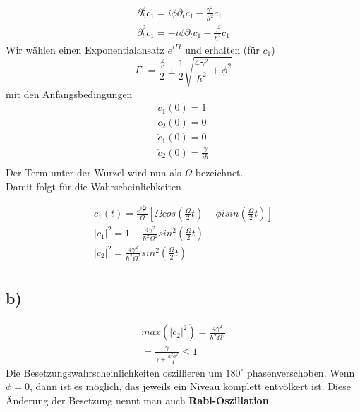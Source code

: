\begin{align}
\partial_t^2 c_1 = i \phi \partial_t c_1 - \frac{\gamma^2}{\hbar^2} c_1 \\
\partial_t^2 c_1 = -i \phi \partial_t c_1 - \frac{\gamma^2}{\hbar^2} c_1
\end{align}
Wir w\"ahlen einen Exponentialansatz $e^{i \Gamma t}$ und erhalten (f\"ur $c_1$)
\begin{equation}
\Gamma_1 = \frac{\phi}{2} \pm \frac{1}{2} \sqrt{\frac{4 \gamma^2}{\hbar^2} + \phi^2}
\end{equation}
mit den Anfangsbedingungen
\begin{align}
c_1 \left( 0 \right) = 1 \\
c_2 \left( 0 \right) = 0 \\
\dot{c}_1 \left( 0 \right) = 0 \\
\dot{c}_2 \left( 0 \right) = \frac{\gamma}{i \hbar} \\
\end{align}
Der Term unter der Wurzel wird nun als $\Omega$ bezeichnet.\\
Damit folgt f\"ur die Wahrscheinlichkeiten

\begin{align}
c_1 \left( t \right) = \frac{e^{i \frac{\theta}{2}t}}{\Omega} \left[ \Omega cos \left( \frac{\Omega}{2} t \right) - \phi i sin \left( \frac{\Omega}{2}t \right) \right] \\
|c_1|^2 = 1 - \frac{4 \gamma^2}{\hbar^2 \Omega^2} sin^2 \left( \frac{\Omega}{2} t \right) \\
|c_2|^2 = \frac{4 \gamma^2}{\hbar^2 \Omega^2} sin^2 \left( \frac{\Omega}{2} t \right) \\
\end{align}

\subsection{b)}

\begin{align}
max \left( |c_2|^2 \right) = \frac{4 \gamma^2}{\hbar^2 \Omega^2} \\
= \frac{\gamma}{\gamma + \frac{\hbar^2 \phi^2}{4}} \leq 1
\end{align}
Die Besetzungswahrscheinlichkeiten oszillieren um $180^{\circ}$ phasenverschoben. Wenn $\phi = 0$, dann ist es m\"oglich, das jeweils ein Niveau komplett entv\"olkert ist. Diese \"Anderung der Besetzung nennt man auch \textbf{Rabi-Oszillation}.
